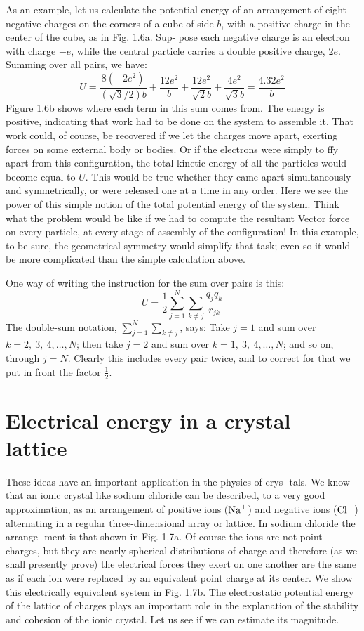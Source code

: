As an example, let us calculate the potential energy of an arrangement
of eight negative charges on the corners of a cube of side $b$,
with a positive charge in the center of the cube, as in Fig. 1.6a. Sup-
pose each negative charge is an electron with charge $-e$, while the
central particle carries a double positive charge, $2e$. Summing over
all pairs, we have:
\begin{equation}
  U = \frac{8(-2e^2)}{(\sqrt{3}/2)b}+\frac{12e^2}{b}+\frac{12e^2}{\sqrt{2}b}
    +\frac{4e^2}{\sqrt{3}b}
    = \frac{4.32e^2}{b}
\end{equation}
Figure 1.6b shows where each term in this sum comes from. The
energy is positive, indicating that work had to be done on the system
to assemble it. That work could, of course, be recovered if we let the
charges move apart, exerting forces on some external body or bodies.
Or if the electrons were simply to ffy apart from this configuration,
the total kinetic energy of all the particles would become equal to $U$.
This would be true whether they came apart simultaneously and
symmetrically, or were released one at a time in any order. Here
we see the power of this simple notion of the total potential energy
of the system. Think what the problem would be like if we had to
compute the resultant Vector force on every particle, at every stage
of assembly of the configuration! In this example, to be sure, the
geometrical symmetry would simplify that task; even so it would be
more complicated than the simple calculation above.

One way of writing the instruction for the sum over pairs is this:
\begin{equation}
  U = \frac{1}{2} \sum_{j=1}^N \sum_{k\ne j} \frac{q_jq_k}{r_{jk}}
\end{equation}
The double-sum notation, $\sum_{j=1}^N \sum_{k\ne j}$, says: Take $j=1$ and sum over
$k = 2,\ 3,\ 4,\ldots,N$; then take $j=2$ and sum over
$k = 1,\ 3,\ 4,\ldots,N$;
and so on, through $j = N$. Clearly this includes every pair twice, and
to correct for that we put in front the factor $\frac{1}{2}$.

\section{Electrical energy in a crystal lattice}

These ideas have an important application in the physics of crys-
tals. We know that an ionic crystal like sodium chloride can be
described, to a very good approximation, as an arrangement of
positive ions ($\textup{Na}^+$) and negative ions ($\textup{Cl}^-$) alternating in a regular
three-dimensional array or lattice. In sodium chloride the arrange-
ment is that shown in Fig. 1.7a. Of course the ions are not point
charges, but they are nearly spherical distributions of charge and
therefore (as we shall presently prove) the electrical forces they exert
on one another are the same as if each ion were replaced by an equivalent
point charge at its center. We show this electrically equivalent
system in Fig. 1.7b. The electrostatic potential energy of the lattice
of charges plays an important role in the explanation of the stability
and cohesion of the ionic crystal. Let us see if we can estimate its
magnitude.

